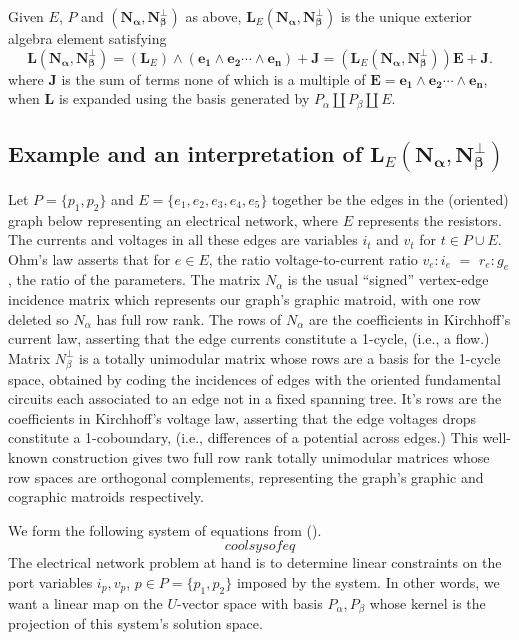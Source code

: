 \documentclass[Unicode]{cedram-alco}
\newcommand{\ext}[1]{\ensuremath{\mathbf{#1}}}
\newcommand{\dunion}{\coprod}
\begin{document}
\begin{defi}
  Given $E$, $P$ and $(\ext{N_\alpha},\ext{N_\beta^\perp})$ as above, $\ext{L}_E(\ext{N_\alpha},\ext{N_\beta^\perp})$ is the
  unique exterior algebra element satisfying
  \[
  \ext{L}(\ext{N_\alpha},\ext{N_\beta^\perp}) =
  (\ext{L}_E)\wedge (\ext{e_1}\wedge\ext{e_2}\cdots\wedge\ext{e_n}) + \ext{J} =
  (\ext{L}_E(\ext{N_\alpha},\ext{N_\beta^\perp}))\ext{E}+\ext{J}.
  \]
  where $\ext{J}$ is the sum of terms none of which is a multiple of $\ext{E}=\ext{e_1}\wedge\ext{e_2}\cdots\wedge\ext{e_n}$, when $\ext{L}$ is expanded using the basis generated by $P_\alpha \dunion P_\beta \dunion E$.
\end{defi}


\subsection{Example and an interpretation of $\ext{L}_E(\ext{N_\alpha},\ext{N_\beta^\perp})$}

Let $P=\{p_1, p_2\}$ and $E=\{e_1, e_2, e_3, e_4, e_5\}$ together be the edges in the (oriented) graph
below representing an electrical network, where $E$ represents the resistors.  The currents and voltages
in all these edges are variables $i_t$ and $v_t$ for $t\in P\cup E$.  Ohm's law
asserts that for $e\in E$, the ratio voltage-to-current ratio
$v_e:i_e$ $=$ $r_e:g_e$, the ratio of the parameters. The matrix $N_\alpha$ is the
usual ``signed'' vertex-edge incidence matrix which represents our graph's graphic matroid, with one
row deleted so $N_\alpha$ has full row rank.  The rows of $N_\alpha$ are the coefficients in
Kirchhoff's current law, asserting that the edge currents constitute a 1-cycle, (i.e., a flow.)
Matrix $N_\beta^\perp$ is a totally unimodular matrix whose
rows are a basis for the 1-cycle space, obtained by coding the incidences of edges with the oriented fundamental
circuits each associated to an edge not in a fixed spanning tree.  It's rows are the coefficients in
Kirchhoff's voltage law, asserting that the edge
voltages drops constitute a 1-coboundary, (i.e., differences
of a potential across edges.)
This well-known construction gives
two full row rank totally unimodular matrices whose row spaces are orthogonal complements,
representing the graph's
graphic and cographic matroids respectively.

We form the following system of equations from ().
\[
cool sys of eq
\]
The electrical network problem at hand is to determine linear constraints on the
port variables $i_p, v_p$, $p\in P = \{p_1, p_2\}$ imposed by the system.  In other words,
we want a linear map on the $U$-vector space with basis $P_\alpha, P_\beta$ whose kernel
is the projection of this system's solution space.
\end{document}
